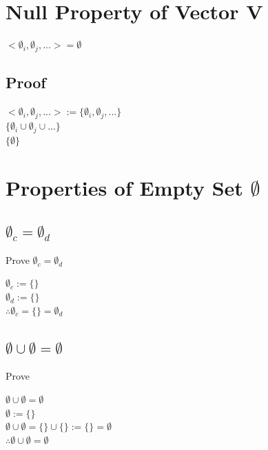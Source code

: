 \documentclass[11pt]{article}
\begin{document}
\section{Null Property of Vector V}
\begin{center}
$
< \emptyset_i, \emptyset_j, ... > = \emptyset
$
\end{center}
\subsection{Proof}
\begin{center}
$
< \emptyset_i, \emptyset_j, ... > := \{ \emptyset_i, \emptyset_j,...\}
$
\\ \vspace{2mm}
$
\{\emptyset_i\cup \emptyset_j \cup...\}
$
\\ \vspace{2mm}
$
\{\emptyset\}
$
\end{center}




\section{Properties of Empty Set $\emptyset$}
\subsection{$\emptyset_c = \emptyset_d$}
Prove $\emptyset_c = \emptyset_d$
\begin{center}
$
\emptyset_c := \{\}
$
\\ \vspace{2mm}
$
\emptyset_d := \{\}
$
\\ \vspace{2mm}
$
\therefore \emptyset_c = \{\} = \emptyset_d
$
\end{center}
\subsection{$\emptyset \cup \emptyset = \emptyset$}
Prove
\begin{center}
$
\emptyset \cup \emptyset = \emptyset
$
\\ \vspace{6mm}
$
\emptyset := \{\}
$
\\ \vspace{2mm}
$
\emptyset \cup \emptyset = \{\} \cup \{\} := \{\} = \emptyset
$
\\ \vspace{2mm}
$
\therefore \emptyset \cup \emptyset = \emptyset
$
\end{center}
\end{document}
